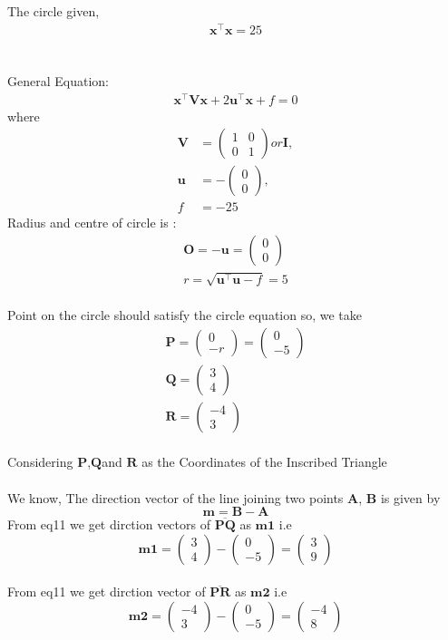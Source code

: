 \documentclass[journal,12pt,twocolumn]{article}
\newcommand{\myvec}[1]{\ensuremath{\begin{pmatrix}#1\end{pmatrix}}}
\let\vec\mathbf
\begin{document}
The circle given,
 \begin{align}
    \label{eq:conic_quad_form}
    \vec{x}^{\top}\vec{x}=25
 \end{align}
\\
\\
General Equation:
\\
\begin{align}
    \label{eq:conic_quad_form}
    \vec{x}^{\top}\vec{V}\vec{x}+2\vec{u}^{\top}\vec{x}+f=0
    \end{align}
where
\begin{align}
	\label{eq:V_matrix}
	\vec{V} &= \myvec{1 & 0\\0 & 1} or \vec{I},
	\\
	\label{eq:u_vector}
	\vec{u} &= -\myvec{0\\0},
	\\
	\label{eq:f_value}
	f &= -25	
\end{align}
Radius and centre of circle is :
\begin{align}
	\label{eq:V_matrix}
	\vec{O} = -\vec{u} = \myvec{0\\0}\\
	r = \sqrt{\vec{u}^{\top}\vec{u}-f} = 5
	 \label{eq-1} 
\end{align}
\\
Point on the circle should satisfy the circle equation so, we take 
\begin{align}
\vec{P}=\myvec{0\\
  -r}=\myvec{0\\-5}
 \\\vec{Q}=\myvec{3\\
  4}
  \\ \vec{R}=\myvec{-4\\
  3}
 \end{align}
\\
Considering $\vec{P}$,$\vec{Q}$and $\vec{R}$ as the Coordinates of the Inscribed Triangle
\\
\\
We know,
The direction vector of the line joining two points $\vec{A}$, $\vec{B}$ is given by
\begin{equation}
	\vec{m}=
     \vec{B}-  \vec{A}
  \label{eq-11}
\end{equation}
From eq11 we get dirction vectors of $\overline{\vec{P}\vec{Q}}$ as $\vec{m1}$ i.e
\\
\begin{equation}
	\vec{m1}=
     \myvec{
  3\\
  4
 }-  \myvec{
  0\\
  -5
 }= \myvec{3\\9}
  \label{eq-12}
\end{equation}
\\
From eq11 we get dirction vector of $\overline{\vec{P}\vec{R}}$ as $\vec{m2}$ i.e
\begin{equation}
	\vec{m2}=
     \myvec{
  -4\\
  3
 }- \myvec{0\\-5} 
 = \myvec{-4\\8}
   \label{eq-13}
\end{equation}
\end{document}
